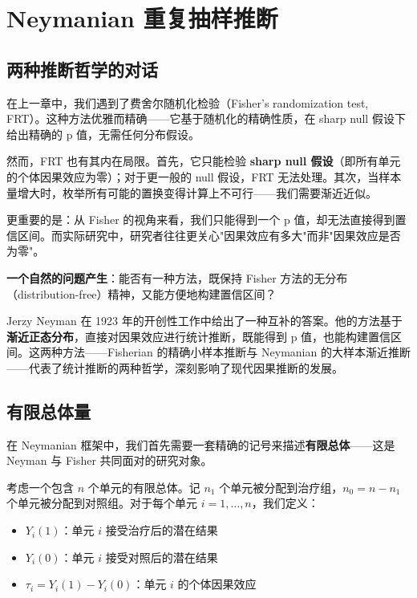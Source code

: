 
\chapter{Neymanian 重复抽样推断}\label{ch:4}

\section{两种推断哲学的对话}\label{sec:4-1}

在上一章中，我们遇到了费舍尔随机化检验（Fisher's randomization test, FRT）。这种方法优雅而精确——它基于随机化的精确性质，在 sharp null 假设下给出精确的 p 值，无需任何分布假设。

然而，FRT 也有其内在局限。首先，它只能检验 \textbf{sharp null 假设}（即所有单元的个体因果效应为零）；对于更一般的 null 假设，FRT 无法处理。其次，当样本量增大时，枚举所有可能的置换变得计算上不可行——我们需要渐近近似。

更重要的是：从 Fisher 的视角来看，我们只能得到一个 p 值，却无法直接得到置信区间。而实际研究中，研究者往往更关心"因果效应有多大"而非"因果效应是否为零"。

\textbf{一个自然的问题产生}：能否有一种方法，既保持 Fisher 方法的无分布（distribution-free）精神，又能方便地构建置信区间？

Jerzy Neyman 在 1923 年的开创性工作中给出了一种互补的答案。他的方法基于\textbf{渐近正态分布}，直接对因果效应进行统计推断，既能得到 p 值，也能构建置信区间。这两种方法——Fisherian 的精确小样本推断与 Neymanian 的大样本渐近推断——代表了统计推断的两种哲学，深刻影响了现代因果推断的发展。


\section{有限总体量}\label{sec:4-2}

在 Neymanian 框架中，我们首先需要一套精确的记号来描述\textbf{有限总体}——这是 Neyman 与 Fisher 共同面对的研究对象。

考虑一个包含 $n$ 个单元的有限总体。记 $n_1$ 个单元被分配到治疗组，$n_0 = n - n_1$ 个单元被分配到对照组。对于每个单元 $i = 1, \ldots, n$，我们定义：

\begin{itemize}
  \item $Y_i(1)$：单元 $i$ 接受治疗后的潜在结果
  \item $Y_i(0)$：单元 $i$ 接受对照后的潜在结果
  \item $\tau_i = Y_i(1) - Y_i(0)$：单元 $i$ 的个体因果效应
\end{itemize}

